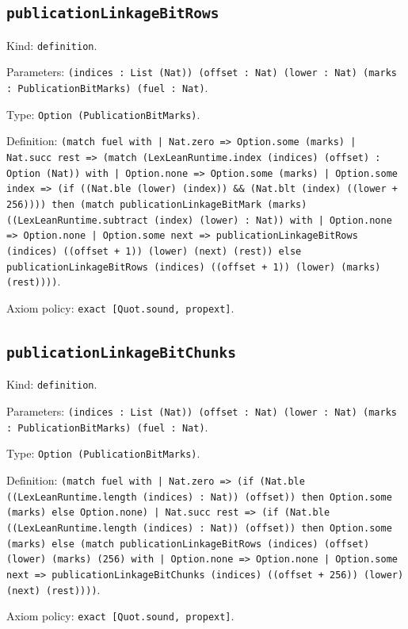 \documentclass[11pt]{article}
\begin{document}
\subsection*{\texttt{publicationLinkageBitRows}}
\noindent Kind: \texttt{definition}.\par
\noindent Parameters: \texttt{(indices : List (Nat)) (offset : Nat) (lower : Nat) (marks : PublicationBitMarks) (fuel : Nat)}.\par
\noindent Type: \texttt{Option (PublicationBitMarks)}.\par
\noindent Definition: \texttt{(match fuel with | Nat.zero => Option.some (marks) | Nat.succ rest => (match (LexLeanRuntime.index (indices) (offset) : Option (Nat)) with | Option.none => Option.some (marks) | Option.some index => (if ((Nat.ble (lower) (index)) \&\& (Nat.blt (index) ((lower + 256)))) then (match publicationLinkageBitMark (marks) ((LexLeanRuntime.subtract (index) (lower) : Nat)) with | Option.none => Option.none | Option.some next => publicationLinkageBitRows (indices) ((offset + 1)) (lower) (next) (rest)) else publicationLinkageBitRows (indices) ((offset + 1)) (lower) (marks) (rest))))}.\par
\noindent Axiom policy: \texttt{exact [Quot.sound, propext]}.\par
\subsection*{\texttt{publicationLinkageBitChunks}}
\noindent Kind: \texttt{definition}.\par
\noindent Parameters: \texttt{(indices : List (Nat)) (offset : Nat) (lower : Nat) (marks : PublicationBitMarks) (fuel : Nat)}.\par
\noindent Type: \texttt{Option (PublicationBitMarks)}.\par
\noindent Definition: \texttt{(match fuel with | Nat.zero => (if (Nat.ble ((LexLeanRuntime.length (indices) : Nat)) (offset)) then Option.some (marks) else Option.none) | Nat.succ rest => (if (Nat.ble ((LexLeanRuntime.length (indices) : Nat)) (offset)) then Option.some (marks) else (match publicationLinkageBitRows (indices) (offset) (lower) (marks) (256) with | Option.none => Option.none | Option.some next => publicationLinkageBitChunks (indices) ((offset + 256)) (lower) (next) (rest))))}.\par
\noindent Axiom policy: \texttt{exact [Quot.sound, propext]}.\par
\end{document}
